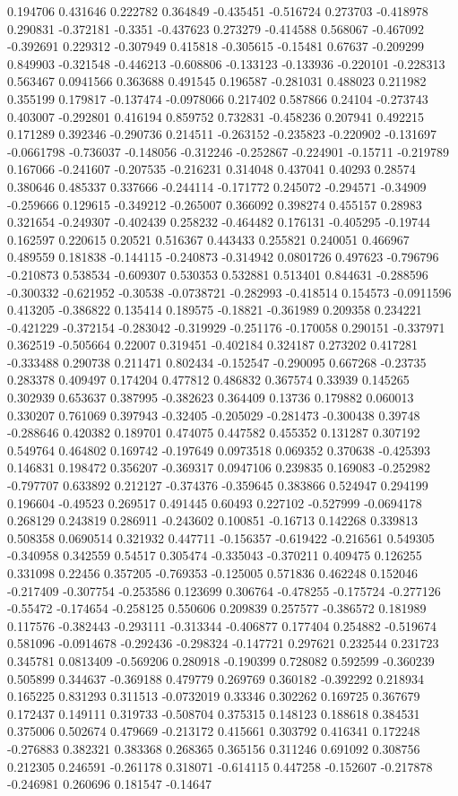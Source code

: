 0.194706 0.431646 0.222782 0.364849 -0.435451 -0.516724 0.273703 -0.418978 0.290831 -0.372181 -0.3351 -0.437623 0.273279 -0.414588 0.568067 -0.467092 -0.392691 0.229312 -0.307949 0.415818 -0.305615 -0.15481 0.67637 -0.209299 0.849903 -0.321548 -0.446213 -0.608806 -0.133123 -0.133936 -0.220101 -0.228313 0.563467 0.0941566 0.363688 0.491545 0.196587 -0.281031 0.488023 0.211982 0.355199 0.179817 -0.137474 -0.0978066 0.217402 0.587866 0.24104 -0.273743 0.403007 -0.292801 0.416194 0.859752 0.732831 -0.458236 0.207941 0.492215 0.171289 0.392346 -0.290736 0.214511 -0.263152 -0.235823 -0.220902 -0.131697 -0.0661798 -0.736037 -0.148056 -0.312246 -0.252867 -0.224901 -0.15711 -0.219789 0.167066 -0.241607 -0.207535 -0.216231 0.314048 0.437041 0.40293 0.28574 0.380646 0.485337 0.337666 -0.244114 -0.171772 0.245072 -0.294571 -0.34909 -0.259666 0.129615 -0.349212 -0.265007 0.366092 0.398274 0.455157 0.28983 0.321654 -0.249307 -0.402439 0.258232 -0.464482 0.176131 -0.405295 -0.19744 0.162597 0.220615 0.20521 0.516367 0.443433 0.255821 0.240051 0.466967 0.489559 0.181838 -0.144115 -0.240873 -0.314942 0.0801726 0.497623 -0.796796 -0.210873 0.538534 -0.609307 0.530353 0.532881 0.513401 0.844631 -0.288596 -0.300332 -0.621952 -0.30538 -0.0738721 -0.282993 -0.418514 0.154573 -0.0911596 0.413205 -0.386822 0.135414 0.189575 -0.18821 -0.361989 0.209358 0.234221 -0.421229 -0.372154 -0.283042 -0.319929 -0.251176 -0.170058 0.290151 -0.337971 0.362519 -0.505664 0.22007 0.319451 -0.402184 0.324187 0.273202 0.417281 -0.333488 0.290738 0.211471 0.802434 -0.152547 -0.290095 0.667268 -0.23735 0.283378 0.409497 0.174204 0.477812 0.486832 0.367574 0.33939 0.145265 0.302939 0.653637 0.387995 -0.382623 0.364409 0.13736 0.179882 0.060013 0.330207 0.761069 0.397943 -0.32405 -0.205029 -0.281473 -0.300438 0.39748 -0.288646 0.420382 0.189701 0.474075 0.447582 0.455352 0.131287 0.307192 0.549764 0.464802 0.169742 -0.197649 0.0973518 0.069352 0.370638 -0.425393 0.146831 0.198472 0.356207 -0.369317 0.0947106 0.239835 0.169083 -0.252982 -0.797707 0.633892 0.212127 -0.374376 -0.359645 0.383866 0.524947 0.294199 0.196604 -0.49523 0.269517 0.491445 0.60493 0.227102 -0.527999 -0.0694178 0.268129 0.243819 0.286911 -0.243602 0.100851 -0.16713 0.142268 0.339813 0.508358 0.0690514 0.321932 0.447711 -0.156357 -0.619422 -0.216561 0.549305 -0.340958 0.342559 0.54517 0.305474 -0.335043 -0.370211 0.409475 0.126255 0.331098 0.22456 0.357205 -0.769353 -0.125005 0.571836 0.462248 0.152046 -0.217409 -0.307754 -0.253586 0.123699 0.306764 -0.478255 -0.175724 -0.277126 -0.55472 -0.174654 -0.258125 0.550606 0.209839 0.257577 -0.386572 0.181989 0.117576 -0.382443 -0.293111 -0.313344 -0.406877 0.177404 0.254882 -0.519674 0.581096 -0.0914678 -0.292436 -0.298324 -0.147721 0.297621 0.232544 0.231723 0.345781 0.0813409 -0.569206 0.280918 -0.190399 0.728082 0.592599 -0.360239 0.505899 0.344637 -0.369188 0.479779 0.269769 0.360182 -0.392292 0.218934 0.165225 0.831293 0.311513 -0.0732019 0.33346 0.302262 0.169725 0.367679 0.172437 0.149111 0.319733 -0.508704 0.375315 0.148123 0.188618 0.384531 0.375006 0.502674 0.479669 -0.213172 0.415661 0.303792 0.416341 0.172248 -0.276883 0.382321 0.383368 0.268365 0.365156 0.311246 0.691092 0.308756 0.212305 0.246591 -0.261178 0.318071 -0.614115 0.447258 -0.152607 -0.217878 -0.246981 0.260696 0.181547 -0.14647 